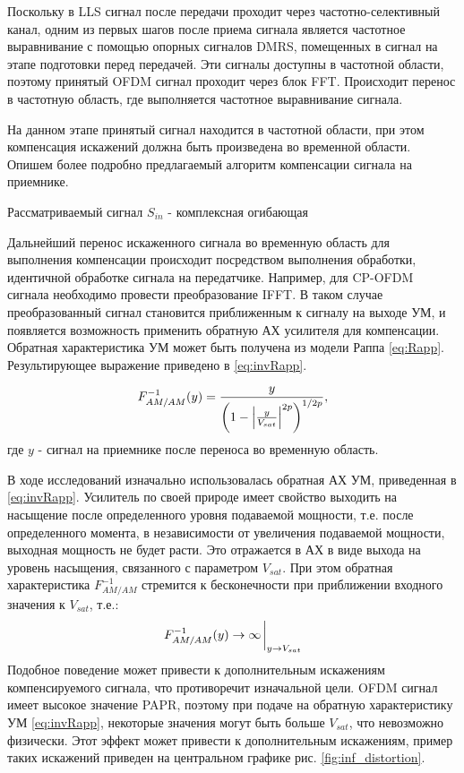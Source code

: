 Поскольку в LLS сигнал после передачи проходит через частотно-селективный
канал, одним из первых шагов после приема сигнала является частотное выравнивание с
помощью опорных сигналов DMRS, помещенных в сигнал на этапе
подготовки перед передачей. Эти сигналы доступны в частотной области,
поэтому принятый OFDM сигнал проходит через блок FFT. Происходит перенос в
частотную область, где выполняется частотное выравнивание сигнала.


На данном этапе принятый сигнал находится в частотной области, при этом
компенсация искажений должна быть произведена во временной области.
Опишем более подробно предлагаемый алгоритм компенсации сигнала на
приемнике.

Рассматриваемый сигнал $S_{in}$ - комплексная огибающая  


Дальнейший перенос искаженного сигнала во временную область для выполнения
компенсации происходит посредством выполнения обработки, идентичной
обработке сигнала на передатчике. Например, для CP-OFDM сигнала необходимо
провести преобразование IFFT. В таком случае преобразованный сигнал
становится приближенным к сигналу на выходе УМ, и появляется возможность
применить обратную АХ усилителя для компенсации. Обратная характеристика УМ
может быть получена из модели Раппа \ref{eq:Rapp}. Результирующее выражение
приведено в \ref{eq:invRapp}.


\begin{equation}
    \displaystyle
    F^{-1}_{AM/AM}(y) = 
       \frac{ y}{\left( 1 - \abs{\frac{y}{V_{sat}}}^{2p}\right)^{1/2p}},
    \label{eq:invRapp}
\end{equation}
где $y$ - сигнал на приемнике после переноса во временную область. 


В ходе исследований изначально использовалась обратная АХ УМ, приведенная в
\ref{eq:invRapp}. Усилитель по своей природе имеет свойство выходить на
насыщение после определенного уровня подаваемой мощности, т.е. после
определенного момента, в независимости от увеличения подаваемой мощности,
выходная мощность не будет расти. Это отражается в АХ в виде выхода на
уровень насыщения, связанного с параметром $V_{sat}$. При этом обратная
характеристика $F^{-1}_{AM/AM}$ стремится к бесконечности при приближении
входного значения к $V_{sat}$, т.е.:
\begin{equation}
    F^{-1}_{AM/AM}(y) \rightarrow \infty \eval_{y \rightarrow V_{sat}}
\end{equation}
Подобное поведение может привести к дополнительным искажениям
компенсируемого сигнала, что противоречит изначальной цели. OFDM сигнал
имеет высокое значение PAPR, поэтому при подаче на обратную характеристику
УМ \ref{eq:invRapp}, некоторые значения могут быть больше $V_{sat}$, что
невозможно физически. Этот эффект может привести к дополнительным
искажениям, пример таких искажений приведен на центральном графике рис.
\ref{fig:inf_distortion}.

